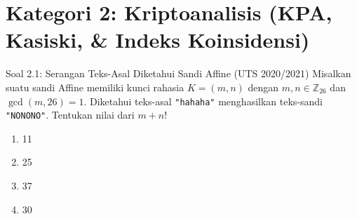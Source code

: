 \documentclass[11pt,a4paper]{article}
\begin{document}
\newpage
\section{Kategori 2: Kriptoanalisis (KPA, Kasiski, \& Indeks Koinsidensi)}

\begin{soalbox}{Soal 2.1: Serangan Teks-Asal Diketahui Sandi Affine (UTS 2020/2021)}
Misalkan suatu sandi Affine memiliki kunci rahasia $K = (m, n)$ dengan $m, n \in \mathbb{Z}_{26}$ dan $\gcd(m, 26) = 1$.
Diketahui teks-asal \texttt{"hahaha"} menghasilkan teks-sandi \texttt{"NONONO"}.
Tentukan nilai dari $m + n$!
\begin{enumerate}[label=(\alph*)]
    \item 11
    \item 25
    \item 37
    \item 30
\end{enumerate}
\end{soalbox}
\end{document}
